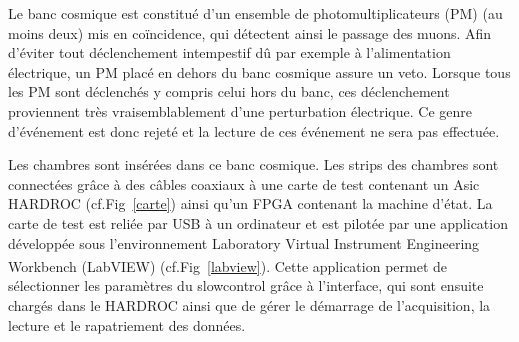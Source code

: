 Le banc cosmique est constitué d'un ensemble de photomultiplicateurs (PM) (au moins deux) mis en coïncidence, qui détectent ainsi le passage des muons. Afin d'éviter tout déclenchement intempestif dû par exemple à l'alimentation électrique, un PM placé en dehors du banc cosmique assure un veto. Lorsque tous les PM sont déclenchés y compris celui hors du banc, ces déclenchement proviennent très vraisemblablement d'une perturbation électrique. Ce genre d'événement est donc rejeté et la lecture de ces événement ne sera pas effectuée.

Les chambres sont insérées dans ce banc cosmique. Les strips des chambres sont connectées grâce à des câbles coaxiaux à une carte de test contenant un Asic HARDROC (cf.Fig~\ref{carte}) ainsi qu'un FPGA contenant la machine d'état. La carte de test est reliée par USB à un ordinateur et est pilotée par une application développée sous l'environnement Laboratory Virtual Instrument Engineering Workbench (LabVIEW\textsuperscript{\textregistered}) (cf.Fig~\ref{labview}). Cette application permet de sélectionner les paramètres du slowcontrol grâce à l'interface, qui sont ensuite chargés dans le HARDROC ainsi que de gérer le démarrage de l'acquisition, la lecture et le rapatriement des données. 

